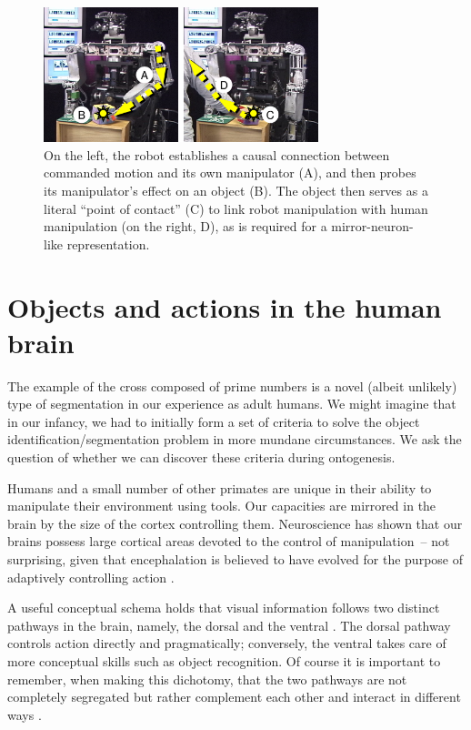 
%
\begin{figure}[tbh]
\begin{center}
\includegraphics[width=8cm]{tracing_causes.eps}
\caption{ 
\label{fig:tracing-causes}
%
On the left, the robot establishes a causal connection between
commanded motion and its own manipulator (A), and then probes its
manipulator's effect on an object (B).  The object then serves as a
literal ``point of contact'' (C) to link robot manipulation with human
manipulation (on the right, D), as is required for a mirror-neuron-like
representation.
%
}
\end{center}
\end{figure}
%

\section{Objects and actions in the human brain}

The example of the cross composed of prime numbers is a novel (albeit
unlikely) type of segmentation in our experience as adult humans. We
might imagine that in our infancy, we had to initially form a set of
criteria to solve the object identification/segmentation problem
in more mundane circumstances.  We ask the question of whether we can
discover these criteria during ontogenesis.

Humans and a small number of other primates are unique in their
ability to manipulate their environment using tools.
Our capacities are mirrored in the brain by the size of
the cortex controlling them.  Neuroscience has shown that our brains
possess large cortical areas devoted to the control of manipulation~--
not surprising, given that encephal\iz{}ation is believed to have evolved
for the purpose of adaptively controlling
action \cite{maturana98tree}.

A useful conceptual schema holds that visual information follows two
distinct pathways in the brain, namely, the dorsal and the ventral
\cite{ungerleider82two,milner95visual}.
The dorsal
pathway controls action directly and pragmatically; conversely, the
ventral takes care of more conceptual skills such as object
recognition.
Of course it is important to remember, when making this dichotomy,
that the two pathways are not completely segregated but rather
complement each other and interact in different
ways \cite{jeannerod97cognitive}.

